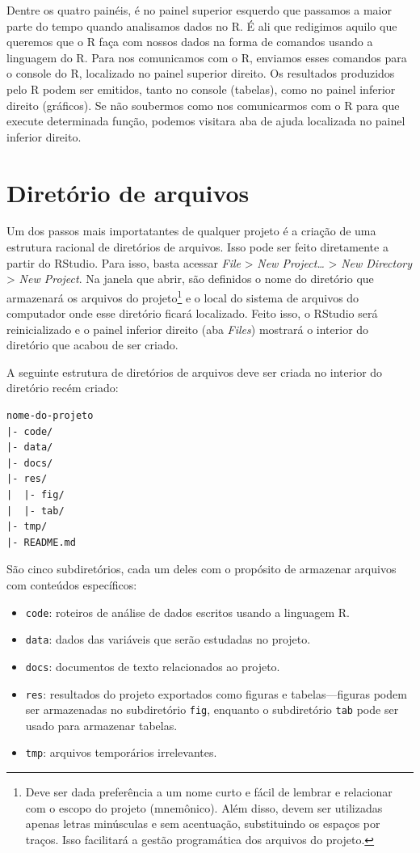\documentclass[
]{book}
\providecommand{\tightlist}{%
  \setlength{\itemsep}{0pt}\setlength{\parskip}{0pt}}
\begin{document}
Dentre os quatro painéis, é no painel superior esquerdo que passamos a maior parte do tempo quando analisamos dados no R. É ali que redigimos aquilo que queremos que o R faça com nossos dados na forma de comandos usando a linguagem do R. Para nos comunicamos com o R, enviamos esses comandos para o console do R, localizado no painel superior direito. Os resultados produzidos pelo R podem ser emitidos, tanto no console (tabelas), como no painel inferior direito (gráficos). Se não soubermos como nos comunicarmos com o R para que execute determinada função, podemos visitara aba de ajuda localizada no painel inferior direito.

\hypertarget{diretuxf3rio-de-arquivos}{%
\chapter{Diretório de arquivos}\label{diretuxf3rio-de-arquivos}}

Um dos passos mais importatantes de qualquer projeto é a criação de uma estrutura racional de diretórios de arquivos. Isso pode ser feito diretamente a partir do RStudio. Para isso, basta acessar \emph{File} \textgreater{} \emph{New Project\ldots{}} \textgreater{} \emph{New Directory} \textgreater{} \emph{New Project}. Na janela que abrir, são definidos o nome do diretório que armazenará os arquivos do projeto\footnote{Deve ser dada preferência a um nome curto e fácil de lembrar e relacionar com o escopo do projeto (mnemônico). Além disso, devem ser utilizadas apenas letras minúsculas e sem acentuação, substituindo os espaços por traços. Isso facilitará a gestão programática dos arquivos do projeto.} e o local do sistema de arquivos do computador onde esse diretório ficará localizado. Feito isso, o RStudio será reinicializado e o painel inferior direito (aba \emph{Files}) mostrará o interior do diretório que acabou de ser criado.

A seguinte estrutura de diretórios de arquivos deve ser criada no interior do diretório recém criado:

\begin{verbatim}
nome-do-projeto
|- code/
|- data/
|- docs/
|- res/
|  |- fig/
|  |- tab/
|- tmp/
|- README.md
\end{verbatim}

São cinco subdiretórios, cada um deles com o propósito de armazenar arquivos com conteúdos específicos:

\begin{itemize}
\tightlist
\item
  \texttt{code}: roteiros de análise de dados escritos usando a linguagem R.
\item
  \texttt{data}: dados das variáveis que serão estudadas no projeto.
\item
  \texttt{docs}: documentos de texto relacionados ao projeto.
\item
  \texttt{res}: resultados do projeto exportados como figuras e tabelas---figuras podem ser armazenadas no subdiretório \texttt{fig}, enquanto o subdiretório \texttt{tab} pode ser usado para armazenar tabelas.
\item
  \texttt{tmp}: arquivos temporários irrelevantes.
\end{itemize}
\end{document}
